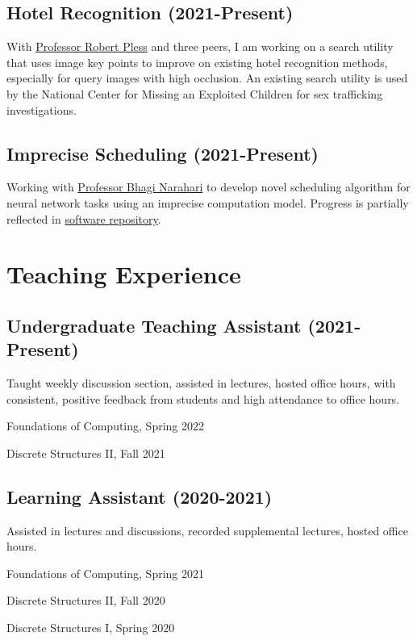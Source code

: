 \documentclass[letterpaper]{article}
\renewenvironment{itemize}{
  \begin{list}{}{
    \setlength{\leftmargin}{1.5em}
  }
}{
  \end{list}
}
\begin{document}
\subsection*{Hotel Recognition (2021-Present)}
With \href{https://www2.seas.gwu.edu/~pless/}{Professor Robert Pless} and three peers, I am working
on a search utility that uses image key points to improve on existing hotel recognition methods,
especially for query images with high occlusion.
An existing search utility is used by the National Center for Missing an Exploited Children
for sex trafficking investigations.

\subsection*{Imprecise Scheduling (2021-Present)}
Working with \href{https://www2.seas.gwu.edu/~narahari/}{Professor Bhagi Narahari} to 
develop novel scheduling algorithm for neural network tasks using an imprecise computation
model. Progress is partially reflected in 
\href{https://github.com/obroadrick/imprecise}{software repository}.

\section*{Teaching Experience}
\subsection*{Undergraduate Teaching Assistant (2021-Present)}
Taught weekly discussion section, assisted in lectures, hosted office hours, with consistent, positive feedback from students and high attendance to office hours.
\begin{itemize}
\item
Foundations of Computing, Spring 2022
\item
Discrete Structures II, Fall 2021
\end{itemize}
\subsection*{Learning Assistant (2020-2021)}
Assisted in lectures and discussions, recorded supplemental lectures, hosted office hours.
\begin{itemize}
\item
Foundations of Computing, Spring 2021
\item
Discrete Structures II, Fall 2020
\item
Discrete Structures I, Spring 2020
\end{itemize}
\end{document}
